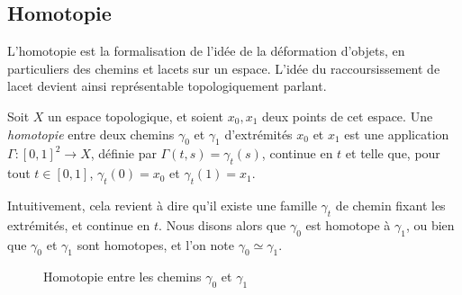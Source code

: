 \subsection{Homotopie}\label{sec:homotopy}

L'homotopie est la formalisation de l'idée de la déformation d'objets, en particuliers des chemins et lacets sur un espace. L'idée du raccoursissement de lacet devient ainsi représentable topologiquement parlant.

\begin{definition}\label{def:homotopy-paths}
Soit $X$ un espace topologique, et soient $x_0, x_1$ deux points de cet espace. Une \emph{homotopie} entre deux chemins $\gamma_0$ et $\gamma_1$ d'extrémités $x_0$ et $x_1$ est une application $\Gamma:[0,1]^2\to X$, définie par $\Gamma(t,s)=\gamma_t(s)$, continue en $t$ et telle que, pour tout $t\in[0,1]$, $\gamma_t(0)=x_0$ et $\gamma_t(1)=x_1$.

Intuitivement, cela revient à dire qu'il existe une famille $\gamma_t$ de chemin fixant les extrémités, et continue en $t$. Nous disons alors que $\gamma_0$ est homotope à $\gamma_1$, ou bien que $\gamma_0$ et $\gamma_1$ sont homotopes, et l'on note $\gamma_0\simeq\gamma_1$.
\end{definition}

\begin{figure}[H]
    \centering
    \caption{Homotopie entre les chemins $\gamma_0$ et $\gamma_1$}
    \label{tkz:path-homotopy}
\end{figure}

